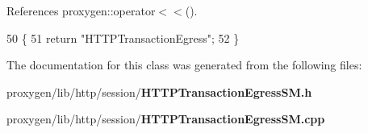 References proxygen\+::operator$<$$<$().


\begin{DoxyCode}
50                                    \{
51     \textcolor{keywordflow}{return} \textcolor{stringliteral}{"HTTPTransactionEgress"};
52   \}
\end{DoxyCode}


The documentation for this class was generated from the following files\+:\begin{DoxyCompactItemize}
\item 
proxygen/lib/http/session/{\bf H\+T\+T\+P\+Transaction\+Egress\+S\+M.\+h}\item 
proxygen/lib/http/session/{\bf H\+T\+T\+P\+Transaction\+Egress\+S\+M.\+cpp}\end{DoxyCompactItemize}
